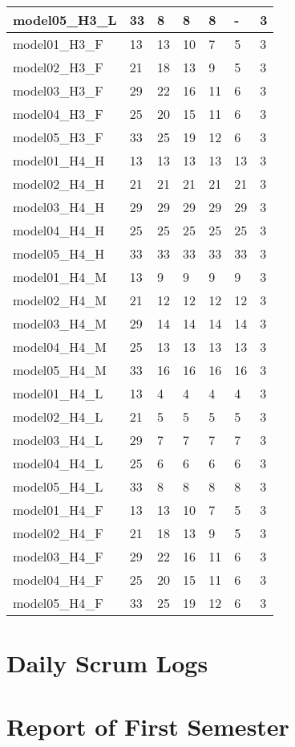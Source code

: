 \begin{longtable}{|l|l|l|l|l|l|l|}
model05\_H3\_L & 33 & 8 & 8 & 8 & - & 3 \\ \hline
model01\_H3\_F & 13 & 13 & 10 & 7 & 5 & 3 \\ \hline
model02\_H3\_F & 21 & 18 & 13 & 9 & 5 & 3 \\ \hline
model03\_H3\_F & 29 & 22 & 16 & 11 & 6 & 3 \\ \hline
model04\_H3\_F & 25 & 20 & 15 & 11 & 6 & 3 \\ \hline
model05\_H3\_F & 33 & 25 & 19 & 12 & 6 & 3 \\ \hline
model01\_H4\_H & 13 & 13 & 13 & 13 & 13 & 3 \\ \hline
model02\_H4\_H & 21 & 21 & 21 & 21 & 21 & 3 \\ \hline
model03\_H4\_H & 29 & 29 & 29 & 29 & 29 & 3 \\ \hline
model04\_H4\_H & 25 & 25 & 25 & 25 & 25 & 3 \\ \hline
model05\_H4\_H & 33 & 33 & 33 & 33 & 33 & 3 \\ \hline
model01\_H4\_M & 13 & 9 & 9 & 9 & 9 & 3 \\ \hline
model02\_H4\_M & 21 & 12 & 12 & 12 & 12 & 3 \\ \hline
model03\_H4\_M & 29 & 14 & 14 & 14 & 14 & 3 \\ \hline
model04\_H4\_M & 25 & 13 & 13 & 13 & 13 & 3 \\ \hline
model05\_H4\_M & 33 & 16 & 16 & 16 & 16 & 3 \\ \hline
model01\_H4\_L & 13 & 4 & 4 & 4 & 4 & 3 \\ \hline
model02\_H4\_L & 21 & 5 & 5 & 5 & 5 & 3 \\ \hline
model03\_H4\_L & 29 & 7 & 7 & 7 & 7 & 3 \\ \hline
model04\_H4\_L & 25 & 6 & 6 & 6 & 6 & 3 \\ \hline
model05\_H4\_L & 33 & 8 & 8 & 8 & 8 & 3 \\ \hline
model01\_H4\_F & 13 & 13 & 10 & 7 & 5 & 3 \\ \hline
model02\_H4\_F & 21 & 18 & 13 & 9 & 5 & 3 \\ \hline
model03\_H4\_F & 29 & 22 & 16 & 11 & 6 & 3 \\ \hline
model04\_H4\_F & 25 & 20 & 15 & 11 & 6 & 3 \\ \hline
model05\_H4\_F & 33 & 25 & 19 & 12 & 6 & 3 \\ \hline
\end{longtable}

\newpage
\section{Daily Scrum Logs}
\label{section:appendix_b}











\newpage
\section{ Report of First Semester}
\label{section:appendix_c}
\newpage

